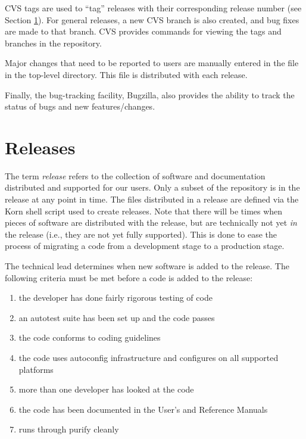 CVS tags are used to ``tag'' releases with their corresponding release
number (see Section \ref{Releases}).  For general releases, a new CVS
branch is also created, and bug fixes are made to that branch.  CVS
provides commands for viewing the tags and branches in the repository.

Major changes that need to be reported to users are manually entered
in the  file in the top-level directory.  This file is
distributed with each \hypre{} release.

Finally, the \hypre{} bug-tracking facility, Bugzilla, also provides
the ability to track the status of bugs and new features/changes.


\section{Releases}
\label{Releases}

The term \hypre{} {\em release} refers to the collection of software
and documentation distributed and supported for our users.  Only a
subset of the repository is in the \hypre{} release at any point in
time.  The files distributed in a release are defined via the Korn
shell script  used to create releases.  Note that
there will be times when pieces of software are distributed with the
release, but are technically not yet {\em in} the release (i.e., they
are not yet fully supported).  This is done to ease the process of
migrating a code from a development stage to a production stage.

The \hypre{} technical lead determines when new software is added to
the release.  The following criteria must be met before a code is
added to the release:
\begin{enumerate}

\item the developer has done fairly rigorous testing of code
\item an autotest suite has been set up and the code passes
\item the code conforms to coding guidelines
\item the code uses autoconfig infrastructure and configures on all
supported platforms
\item more than one developer has looked at the code
\item the code has been documented in the User's and Reference Manuals
\item runs through purify cleanly

\end{enumerate}

